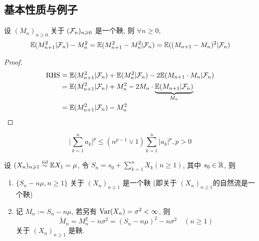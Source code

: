 \subsection{基本性质与例子}

\begin{property}\label{prt:p142-prt1}
设 $(M_n)_{n\geq 0}$ 关于 $(\mathcal{F}_n)_{n\geqslant 0}$ 是一个鞅, 则 $\forall n\geq 0$,
\[
\mathbb E(M_{n+1}^2|\mathcal{F}_n)-M_n^2=\mathbb E(M_{n+1}^2-M_n^2|\mathcal{F}_n)=\mathbb E((M_{n+1}-M_n)^2|\mathcal{F}_n)
\]
\end{property}

\begin{proof}
    \[
    \begin{aligned}
        \operatorname{RHS} &= \mathbb E(M_{n+1}^2|\mathcal{F}_n)+\mathbb E(M_n^2|\mathcal{F}_n)-2\mathbb E(M_{n+1}\cdot M_n|\mathcal{F}_n)\\
        &=\mathbb E(M_{n+1}^2|\mathcal{F}_n)+M_n^2-2M_n\cdot \underbrace{\mathbb E(M_{n+1}|\mathcal{F}_n)}_{M_n}\\
        &=\mathbb E(M_{n+1}^2|\mathcal{F}_n)-M_n^2
    \end{aligned}
    \]
\end{proof}

\begin{lemma}\label{lem:p117}
\[
\bigg|
    \sum_{k=1}^n a_k
\bigg|^p\leq
(n^{p-1}\lor 1)\sum_{k=1}^n |a_k|^p, p>0
\]
\end{lemma}

\begin{example}\label{exa:p142-exa5.2}
    设 $(X_n)_{n\geqslant 1}\overset{\text{iid}}{\sim}\mathbb E X_1=\mu$, 令 $S_n=s_0+\sum_{k=1}^n X_k(n\geq 1)$, 其中 $s_0\in \mathbb{R}$, 则
    \begin{enumerate}
        \item $\{S_n-n\mu,n\geq 1\}$ 关于 $(X_n)_{n\geq 1}$ 是一个鞅 (即关于 $(X_n)_{n\geq 1}$的自然流是一个鞅)
        \item 记 $M_n:=S_n-n\mu$, 若另有 $\operatorname{Var}(X_n)=\sigma^2<\infty$, 则
        \[
        \tilde{M}_n=M_n^2-n\sigma^2=(S_n-n\mu)^2-n\sigma^2\quad (n\geq 1)
        \]
        关于 $(X_n)_{n\geq 1}$ 是鞅.
    \end{enumerate}
\end{example}

